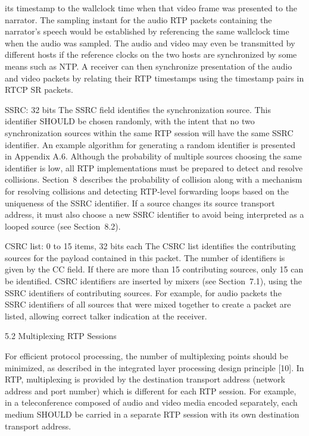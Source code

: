 \documentclass{article}
\begin{document}
its timestamp to the wallclock time when that video frame was presented to the narrator.  The sampling instant for the audio RTP packets containing the narrator's speech would be established by referencing the same wallclock time when the audio was sampled. The audio and video may even be transmitted by different hosts if the reference clocks on the two hosts are synchronized by some means such as NTP.  A receiver can then synchronize presentation of the audio and video packets by relating their RTP timestamps using the timestamp pairs in RTCP SR packets.

SSRC: 32 bits The SSRC field identifies the synchronization source.  This identifier SHOULD be chosen randomly, with the intent that no two synchronization sources within the same RTP session will have the same SSRC identifier.  An example algorithm for generating a random identifier is presented in Appendix A.6.  Although the probability of multiple sources choosing the same identifier is low, all RTP implementations must be prepared to detect and resolve collisions.  Section~8 describes the probability of collision along with a mechanism for resolving collisions and detecting RTP-level forwarding loops based on the uniqueness of the SSRC identifier.  If a source changes its source transport address, it must also choose a new SSRC identifier to avoid being interpreted as a looped source (see Section~8.2).

CSRC list: 0 to 15 items, 32 bits each The CSRC list identifies the contributing sources for the payload contained in this packet.  The number of identifiers is given by the CC field.  If there are more than 15 contributing sources, only 15 can be identified.  CSRC identifiers are inserted by mixers (see Section~7.1), using the SSRC identifiers of contributing sources.  For example, for audio packets the SSRC identifiers of all sources that were mixed together to create a packet are listed, allowing correct talker indication at the receiver.

5.2 Multiplexing RTP Sessions

For efficient protocol processing, the number of multiplexing points should be minimized, as described in the integrated layer processing design principle [10].  In RTP, multiplexing is provided by the destination transport address (network address and port number) which is different for each RTP session.  For example, in a teleconference composed of audio and video media encoded separately, each medium SHOULD be carried in a separate RTP session with its own destination transport address.
\end{document}
